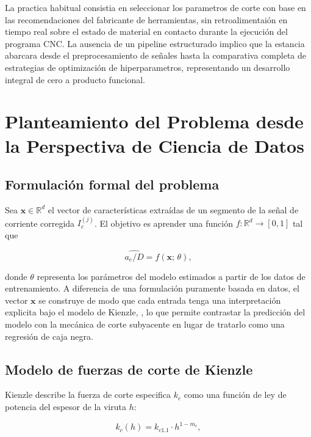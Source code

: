 \documentclass[12pt, letterpaper]{article}
\begin{document}
La practica habitual consistia en seleccionar los parametros de corte con base en las recomendaciones del fabricante de herramientas, sin retroalimentaión en tiempo real sobre el estado de material en contacto durante la ejecución del programa CNC. La ausencia de un pipeline estructurado implico que la estancia abarcara desde el preprocesamiento de señales hasta la comparativa completa de estrategias de optimización de hiperparametros, representando un desarrollo integral de cero a producto funcional.

\section{Planteamiento del Problema desde la Perspectiva de Ciencia de Datos}

\subsection{Formulación formal del problema}

Sea $\mathbf{x} \in \mathbb{R}^d$ el vector de características extraídas de un segmento de la señal de corriente corregida $I_c^{(j)}$. El objetivo es aprender una función $f: \mathbb{R}^d \to [0,1]$ tal que

\begin{equation}
  \widehat{a_e/D} = f(\mathbf{x};\,\theta),
  \label{eq:problema}
\end{equation}

donde $\theta$ representa los parámetros del modelo estimados a partir de los datos de entrenamiento. A diferencia de una formulación puramente basada en datos, el vector $\mathbf{x}$ se construye de modo que cada entrada tenga una interpretación explicita bajo el modelo de Kienzle, \cite{kienzle1957}, lo que permite contrastar la predicción del modelo con la mecánica de corte subyacente en lugar de tratarlo como una regresión de caja negra.

\subsection{Modelo de fuerzas de corte de Kienzle}
\label{sec:kienzle}

Kienzle \cite{kienzle1957} describe la fuerza de corte especifica $k_c$ como una función de ley de potencia del espesor de la viruta $h$:

\begin{equation}
  k_c(h) = k_{c1.1} \cdot h^{1-m_c},
  \label{eq:kc}
\end{equation}
\end{document}
